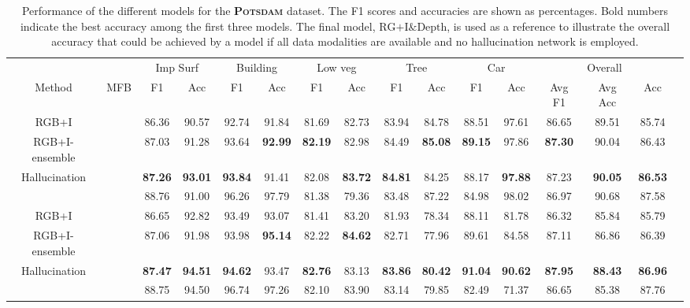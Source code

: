 \documentclass[journal]{IEEEtran}
\newcommand{\cmark}{\ding{51}}%
\newcommand{\xmark}{\ding{55}}%
\begin{document}
\begin{table*}[t]
\begin{center}
\begin{tabular}{lc|c|c|c|c|c|c|c|c|c|c|c|c|c|c|}
\cline{3-15}
& & \multicolumn{2}{|c|}{Imp Surf} & \multicolumn{2}{c|}{Building} & \multicolumn{2}{c|}{Low veg} & \multicolumn{2}{c|}{Tree} & \multicolumn{2}{c|}{Car} & \multicolumn{3}{c|}{Overall}\\
\cline{1-15}
\multicolumn{1}{|c|}{Method} & \multicolumn{1}{|c|}{MFB} & F1 & Acc & F1 & Acc & F1 & Acc & F1 & Acc & F1 & Acc & Avg F1 & Avg Acc & Acc\\
\cline{1-15} 
\multicolumn{1}{|c|}{RGB+I} & \cmark & 86.36 & 90.57 & 92.74 & 91.84 & 81.69 & 82.73 & 83.94 & 84.78 & 88.51 & 97.61 & 86.65 & 89.51 & 85.74\\
\cline{2-15}
\multicolumn{1}{|c|}{RGB+I-ensemble} & \cmark & 87.03 & 91.28 & 93.64 & {\bf92.99} & {\bf82.19} & 82.98 & 84.49 & {\bf85.08} & {\bf89.15} & 97.86 & {\bf87.30} & 90.04 & 86.43 \\
\cline{2-15}
\multicolumn{1}{|c|}{Hallucination} & \cmark & {\bf87.26} & {\bf93.01} & {\bf93.84} & 91.41 & 82.08 & {\bf83.72} & {\bf84.81} & 84.25 & 88.17 & {\bf97.88} & 87.23 & {\bf90.05} & {\bf86.53} \\
\hdashline
\multicolumn{1}{|c|}{RGB+I\&Depth} & \cmark & 88.76 & 91.00 & 96.26 & 97.79 & 81.38 & 79.36 & 83.48 & 87.22 & 84.98 & 98.02 & 86.97 & 90.68 & 87.58 \\
\hline
\hline
\multicolumn{1}{|c|}{RGB+I} & \xmark & 86.65 & 92.82 & 93.49 & 93.07 & 81.41 & 83.20 & 81.93 & 78.34 & 88.11 & 81.78 & 86.32 & 85.84 & 85.79\\
\hline
\multicolumn{1}{|c|}{RGB+I-ensemble} & \xmark & 87.06 & 91.98 & 93.98 & {\bf95.14} & 82.22 & {\bf84.62} & 82.71 & 77.96 & 89.61 & 84.58 & 87.11 & 86.86 & 86.39 \\
\hline
\multicolumn{1}{|c|}{Hallucination} & \xmark & {\bf87.47} & {\bf94.51} & {\bf94.62} & 93.47 & {\bf82.76} & 83.13 & {\bf83.86} & {\bf80.42} & {\bf91.04} & {\bf90.62} & {\bf87.95} & {\bf88.43} & {\bf86.96}\\
\hdashline
\multicolumn{1}{|c|}{RGB+I\&Depth} & \xmark & 88.75 & 94.50 & 96.74 & 97.26 & 82.10 & 83.90 & 83.14 & 79.85 & 82.49 & 71.37 & 86.65 & 85.38 & 87.76\\
\hline
\end{tabular}
\vspace{0.2cm}
\caption{Performance of the different models for the {\bf\scshape Potsdam} dataset. The F1 scores and accuracies are shown as percentages. Bold numbers indicate the best accuracy among the first three models. The final model, $\text{RG+I\&Depth}$, is used as a reference to illustrate the overall accuracy that could be achieved by a model if all data modalities are available and no hallucination network is employed.}
\label{tab:resultsMFBPotsdam}
\end{center}
\end{table*}
\end{document}
